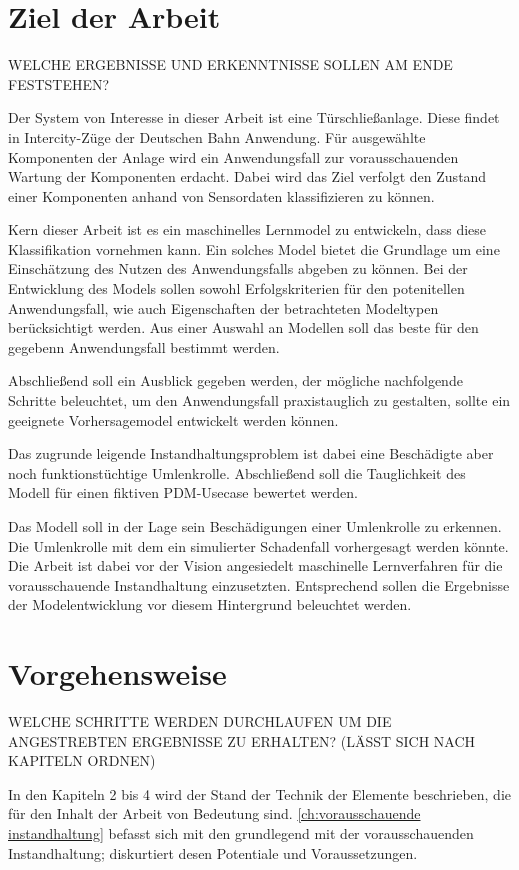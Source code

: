 \section{Ziel der Arbeit}
\label{sec:ziel}
WELCHE ERGEBNISSE UND ERKENNTNISSE SOLLEN AM ENDE FESTSTEHEN?

Der System von Interesse in dieser Arbeit ist eine Türschließanlage. Diese findet in Intercity-Züge der Deutschen Bahn Anwendung. Für ausgewählte Komponenten der Anlage wird ein Anwendungsfall zur vorausschauenden Wartung der Komponenten erdacht. Dabei wird das Ziel verfolgt den Zustand einer Komponenten anhand von Sensordaten klassifizieren zu können. 

Kern dieser Arbeit ist es ein maschinelles Lernmodel zu entwickeln, dass diese Klassifikation vornehmen kann. Ein solches Model bietet die Grundlage um eine Einschätzung des Nutzen des Anwendungsfalls abgeben zu können. Bei der Entwicklung des Models sollen sowohl Erfolgskriterien für den potenitellen Anwendungsfall, wie auch Eigenschaften der betrachteten Modeltypen berücksichtigt werden. Aus einer Auswahl an Modellen soll das beste für den gegebenn Anwendungsfall bestimmt werden.

Abschließend soll ein Ausblick gegeben werden, der mögliche nachfolgende Schritte beleuchtet, um den Anwendungsfall praxistauglich zu gestalten, sollte ein geeignete Vorhersagemodel entwickelt werden können.

Das zugrunde leigende Instandhaltungsproblem ist dabei eine Beschädigte aber noch funktionstüchtige Umlenkrolle. Abschließend soll die Tauglichkeit des Modell für einen fiktiven PDM-Usecase bewertet werden. 



Das Modell soll in der Lage sein Beschädigungen einer Umlenkrolle zu erkennen. Die Umlenkrolle mit dem ein simulierter Schadenfall vorhergesagt werden könnte. Die Arbeit ist dabei vor der Vision angesiedelt maschinelle Lernverfahren für die vorausschauende Instandhaltung einzusetzten. Entsprechend sollen die Ergebnisse der Modelentwicklung vor diesem Hintergrund beleuchtet werden.

\section{Vorgehensweise}
\label{sec:vorgehensweise}
WELCHE SCHRITTE WERDEN DURCHLAUFEN UM DIE ANGESTREBTEN ERGEBNISSE ZU ERHALTEN?
(LÄSST SICH NACH KAPITELN ORDNEN)

In den Kapiteln 2 bis 4 wird der Stand der Technik der Elemente beschrieben, die für den Inhalt der Arbeit von Bedeutung sind. \cref{ch:vorausschauende instandhaltung} befasst sich mit den grundlegend mit der vorausschauenden Instandhaltung; diskurtiert desen Potentiale und Voraussetzungen.

